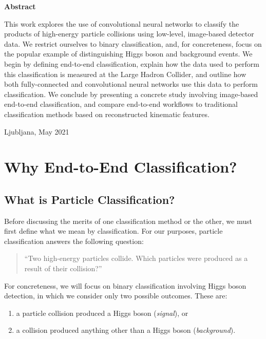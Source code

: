 \documentclass[11pt, a4paper]{article}
\begin{document}
\vspace{10mm}
\begin{center}
    \textbf{Abstract}\\[2mm]
    \begin{minipage}[t]{0.85\textwidth}
        This work explores the use of convolutional neural networks to classify the products of high-energy particle collisions using low-level, image-based detector data. We restrict ourselves to binary classification, and, for concreteness, focus on the popular example of distinguishing Higgs boson and background events. We begin by defining end-to-end classification, explain how the data used to perform this classification is measured at the Large Hadron Collider, and outline how both fully-connected and convolutional neural networks use this data to perform classification. We conclude by presenting a concrete study involving image-based end-to-end classification, and compare end-to-end workflows to traditional classification methods based on reconstructed kinematic features.
    \end{minipage}

    \vspace{10mm}
    \large{Ljubljana, May 2021}
\end{center}

\newpage
\thispagestyle{empty}
\tableofcontents 
\newpage

\section{Why End-to-End Classification?}
\subsection{What is Particle Classification?}
Before discussing the merits of one classification method or the other, we must first define what we mean by classification. For our purposes, particle classification answers the following question:
\begin{quote}
    ``Two high-energy particles collide. Which particles were produced as a result of their collision?''
\end{quote}
    For concreteness, we will focus on binary classification involving Higgs boson detection, in which we consider only two possible outcomes. These are:
\begin{enumerate}

    \item a particle collision produced a Higgs boson (\textit{signal}), or

    \item a collision produced anything other than a Higgs boson (\textit{background}).

\end{enumerate}
\end{document}
